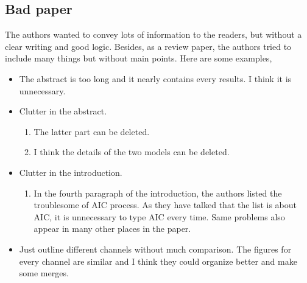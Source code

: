 \documentclass[12pt]{article}
\begin{document}
\subsection{Bad paper}
The authors wanted to convey lots of information to the readers, but without a clear writing and good logic. Besides, as a review paper, the authors tried to include many things but without main points. Here are some examples,
\begin{itemize}
    \item The abstract is too long and it nearly contains every results. I think it is unnecessary. 
    \item Clutter in the abstract. 
        \begin{enumerate}
            \item {} The latter part can be deleted.
            \item {} I think the details of the two models can be deleted.
        \end{enumerate}
    \item Clutter in the introduction. 
        \begin{enumerate}
            \item In the fourth paragraph of the introduction, the authors listed the troublesome of AIC process. As they have talked that the list is about AIC, it is unnecessary to type AIC every time. Same problems also appear in many other places in the paper.
        \end{enumerate}
    \item Just outline different channels without much comparison. The figures for every channel are similar and I think they could organize better and make some merges.
\end{itemize}
\end{document}
